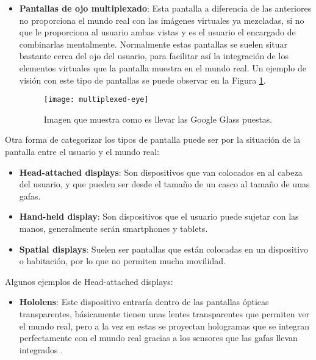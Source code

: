 \begin{itemize}
\begin{itemize}
\begin{itemize}
  \item \textbf{Pantallas de ojo multiplexado}: Esta pantalla a diferencia de las anteriores no proporciona el mundo real con las imágenes virtuales ya mezcladas, si no que le proporciona al usuario ambas vistas y es el usuario el encargado de combinarlas mentalmente. Normalmente estas pantallas se suelen situar bastante cerca del ojo del usuario, para facilitar así la integración de los elementos virtuales que la pantalla muestra en el mundo real. Un ejemplo de visión con este tipo de pantallas se puede observar en la Figura \ref{figura-ojo-multiplexado}.

  \begin{figure}[h]
    \centering
    \texttt{[image: multiplexed-eye]}
    \caption{Imagen que muestra como es llevar las Google Glass puestas.\protect\footnotemark}
    \label{figura-ojo-multiplexado}
  \end{figure}


\end{itemize}

\newpage

\begin{flushleft}
Otra forma de categorizar los tipos de pantalla puede ser por la situación de la pantalla entre el usuario y el mundo real:
\end{flushleft}

\begin{itemize}
  \item \textbf{Head-attached displays}: Son dispositivos que van colocados en al cabeza del usuario, y que pueden ser desde el tamaño de un casco al tamaño de unas gafas.

  \item \textbf{Hand-held display}: Son dispositivos que el usuario puede sujetar con las manos, generalmente serán smartphones y tablets.

  \item \textbf{Spatial displays}: Suelen ser pantallas que están colocadas en un dispositivo o habitación, por lo que no permiten mucha movilidad.

\end{itemize}

\begin{flushleft}
Algunos ejemplos de Head-attached displays:
\end{flushleft}

\begin{itemize}
  \item \textbf{Hololens}: Este dispositivo entraría dentro de las pantallas ópticas transparentes, básicamente tienen unas lentes transparentes que permiten ver el mundo real, pero a la vez en estas se proyectan hologramas que se integran perfectamente con el mundo real gracias a los sensores que las gafas llevan integrados \cite{hololens}.


\end{itemize}
\end{itemize}
\end{itemize}
